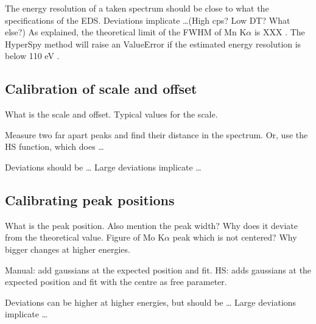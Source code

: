 

The energy resolution of a taken spectrum should be close to what the specifications of the EDS.
Deviations implicate \dots (High cps? Low DT? What else?)
As explained, the theoretical limit of the FWHM of Mn K$\alpha$ is XXX .
The HyperSpy method will raise an ValueError if the estimated energy resolution is below 110 eV .




\subsection{Calibration of scale and offset}
\label{theory:qc:scaleoffset}

What is the scale and offset.
Typical values for the scale.

Measure two far apart peaks and find their distance in the spectrum.
Or, use the HS function, which does \dots

Deviations should be \dots
Large deviations implicate \dots


\subsection{Calibrating peak positions}
\label{theory:qc:peakpositions}

What is the peak position.
Also mention the peak width?
Why does it deviate from the theoretical value.
Figure of Mo K$\alpha$ peak which is not centered?
Why bigger changes at higher energies.

Manual: add gaussians at the expected position and fit.
HS: adds gaussians at the expected position and fit with the centre as free parameter.

Deviations can be higher at higher energies, but should be \dots
Large deviations implicate \dots



